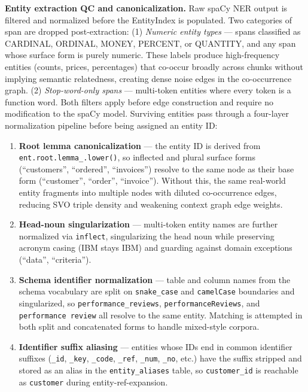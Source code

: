 \textbf{Entity extraction QC and canonicalization.} Raw spaCy NER output is filtered and normalized before the EntityIndex is populated. Two categories of span are dropped post-extraction: (1) \emph{Numeric entity types} --- spans classified as CARDINAL, ORDINAL, MONEY, PERCENT, or QUANTITY, and any span whose surface form is purely numeric. These labels produce high-frequency entities (counts, prices, percentages) that co-occur broadly across chunks without implying semantic relatedness, creating dense noise edges in the co-occurrence graph. (2) \emph{Stop-word-only spans} --- multi-token entities where every token is a function word. Both filters apply before edge construction and require no modification to the spaCy model. Surviving entities pass through a four-layer normalization pipeline before being assigned an entity ID:

\begin{enumerate}
\def\labelenumi{\arabic{enumi}.}
\item
  \textbf{Root lemma canonicalization} --- the entity ID is derived from \texttt{ent.\allowbreak{}root.\allowbreak{}lemma\_.\allowbreak{}lower()}, so inflected and plural surface forms (``customers'', ``ordered'', ``invoices'') resolve to the same node as their base form (``customer'', ``order'', ``invoice''). Without this, the same real-world entity fragments into multiple nodes with diluted co-occurrence edges, reducing SVO triple density and weakening context graph edge weights.
\item
  \textbf{Head-noun singularization} --- multi-token entity names are further normalized via \texttt{inflect}, singularizing the head noun while preserving acronym casing (IBM stays IBM) and guarding against domain exceptions (``data'', ``criteria'').
\item
  \textbf{Schema identifier normalization} --- table and column names from the schema vocabulary are split on \texttt{snake\_case} and \texttt{camelCase} boundaries and singularized, so \texttt{performance\_reviews}, \texttt{performanceReviews}, and \texttt{performance\ review} all resolve to the same entity. Matching is attempted in both split and concatenated forms to handle mixed-style corpora.
\item
  \textbf{Identifier suffix aliasing} --- entities whose IDs end in common identifier suffixes (\texttt{\_id}, \texttt{\_key}, \texttt{\_code}, \texttt{\_ref}, \texttt{\_num}, \texttt{\_no}, etc.) have the suffix stripped and stored as an alias in the \texttt{entity\_aliases} table, so \texttt{customer\_id} is reachable as \texttt{customer} during entity-ref-expansion.
\end{enumerate}

